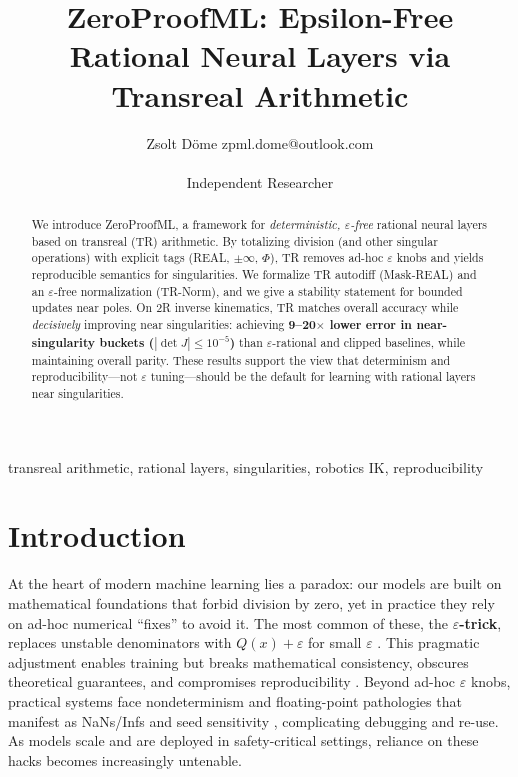 \documentclass[11pt,twoside]{article}
\title{ZeroProofML: Epsilon-Free Rational Neural Layers via Transreal Arithmetic}
\author{\name Zsolt D\"ome \email zpml.dome@outlook.com \\\\
\addr Independent Researcher}
\begin{document}
\maketitle

\begin{abstract}
We introduce ZeroProofML, a framework for \emph{deterministic, $\varepsilon$-free} rational neural layers based on transreal (TR) arithmetic. By totalizing division (and other singular operations) with explicit tags (REAL, $\pm\infty$, $\Phi$), TR removes ad-hoc $\varepsilon$ knobs and yields reproducible semantics for singularities. We formalize TR autodiff (Mask-REAL) and an $\varepsilon$-free normalization (TR-Norm), and we give a stability statement for bounded updates near poles. On 2R inverse kinematics, TR matches overall accuracy while \emph{decisively} improving near singularities: achieving \textbf{9--20$\times$ lower error in near-singularity buckets ($|\det J|\le10^{-5}$)} than $\varepsilon$-rational and clipped baselines, while maintaining overall parity. These results support the view that determinism and reproducibility---not $\varepsilon$ tuning---should be the default for learning with rational layers near singularities.
\end{abstract}

\begin{keywords}
transreal arithmetic, rational layers, singularities, robotics IK, reproducibility
\end{keywords}

\section{Introduction}
At the heart of modern machine learning lies a paradox: our models are built on mathematical foundations that forbid division by zero, yet in practice they rely on ad-hoc numerical ``fixes'' to avoid it. The most common of these, the \textbf{$\varepsilon$-trick}, replaces unstable denominators with $Q(x)+\varepsilon$ for small $\varepsilon$ \citep{ioffe2015batchnorm,boulle2020rational}. This pragmatic adjustment enables training but breaks mathematical consistency, obscures theoretical guarantees, and compromises reproducibility \citep{henderson2018rlmatters}. Beyond ad-hoc $\varepsilon$ knobs, practical systems face nondeterminism and floating-point pathologies that manifest as NaNs/Infs and seed sensitivity \citep{micikevicius2018mixedprecision,higham2002accuracy}, complicating debugging and re-use. As models scale and are deployed in safety-critical settings, reliance on these hacks becomes increasingly untenable.
\end{document}
